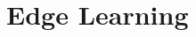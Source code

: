 \documentclass[../mthe-493-final-project.tex]{subfiles}
\begin{document}
    \chapter{Edge Learning}
    \label{ch:edge-learning}

    
\end{document}
